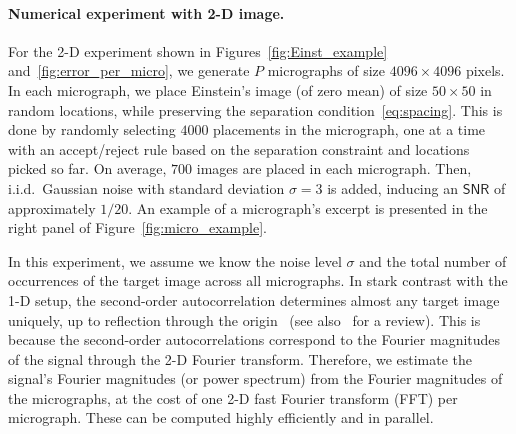 \documentclass[english,11pt]{article}
\newcommand{\1}{\mathbf{1}}
\newcommand{\TODO}[1]{{\color{red}{[#1]}}}
\numberwithin{equation}{section}
\theoremstyle{plain}
\theoremstyle{definition}
\theoremstyle{remark}
\theoremstyle{plain}
\theoremstyle{remark}
\theoremstyle{plain}
\theoremstyle{plain}
\newcommand{\SNR}{\ensuremath{\textsf{SNR}}}
\begin{document}
%
%
%
%




\paragraph{Numerical experiment with 2-D image.}

For the 2-D experiment shown in Figures~\ref{fig:Einst_example} and~\ref{fig:error_per_micro}, we generate $P$ micrographs of size $4096\times 4096$ pixels. 
In each micrograph, we place Einstein's image (of zero mean) of size $50\times 50$  in random locations, while preserving the separation condition~\eqref{eq:spacing}.  
This is done by randomly selecting $4000$ placements in the micrograph, one at a time with
an accept/reject rule based on the separation constraint and locations picked so far.
On average, $700$ images are placed in each micrograph.   
Then, i.i.d.\ Gaussian noise with standard deviation $\sigma=3$ is added, inducing an $\SNR$ of approximately $1/20$.
An example of a micrograph's excerpt is presented in the right panel of Figure~\ref{fig:micro_example}.


In this experiment, we assume we know the noise level $\sigma$ and the total number of occurrences of the target image across all micrographs.
In stark contrast with the 1-D setup, the second-order autocorrelation determines almost any target image uniquely, up to reflection through the origin~\cite{hayes1982reconstruction} (see also~\cite{bendory2017fourier} for a review). This is because the second-order autocorrelations correspond to the Fourier magnitudes of the signal through the 2-D Fourier transform. 
Therefore, we estimate the signal's Fourier magnitudes (or power spectrum) from the Fourier magnitudes of the micrographs, at the cost of one 2-D fast Fourier transform (FFT) per micrograph. These can be computed highly efficiently and in parallel.
\end{document}

